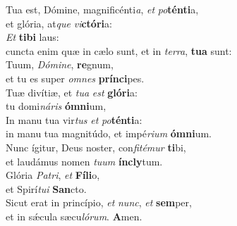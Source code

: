 \evenverse Tua est, Dómine, magnificénti\textit{a}, \textit{et} \textit{po}\textbf{tén}\textbf{ti}a,~\*\\
\evenverse et glória, at\textit{que} \textit{vi}\textbf{ctó}\textbf{ri}a:\\
\oddverse \textit{Et} \textbf{ti}\textbf{bi} laus:~\*\\
\oddverse cuncta enim quæ in cælo sunt, et in \textit{ter}\textit{ra}, \textbf{tu}\textbf{a} sunt:\\
\evenverse Tuum, \textit{Dó}\textit{mi}\textit{ne}, \textbf{re}gnum,~\*\\
\evenverse et tu es super \textit{om}\textit{nes} \textbf{prín}\textbf{ci}pes.\\
\oddverse Tuæ divítiæ, et \textit{tu}\textit{a} \textit{est} \textbf{gló}\textbf{ri}a:~\*\\
\oddverse tu domi\textit{ná}\textit{ris} \textbf{óm}\textbf{ni}um,\\
\evenverse In manu tua vir\textit{tus} \textit{et} \textit{po}\textbf{tén}\textbf{ti}a:~\*\\
\evenverse in manu tua magnitúdo, et impé\textit{ri}\textit{um} \textbf{óm}\textbf{ni}um.\\
\oddverse Nunc ígitur, Deus noster, con\textit{fi}\textit{té}\textit{mur} \textbf{ti}bi,~\*\\
\oddverse et laudámus nomen \textit{tu}\textit{um} \textbf{ín}\textbf{cly}tum.\\
\evenverse Glória \textit{Pa}\textit{tri}, \textit{et} \textbf{Fí}\textbf{li}o,~\*\\
\evenverse et Spirí\textit{tu}\textit{i} \textbf{San}cto.\\
\oddverse Sicut erat in princípio, \textit{et} \textit{nunc}, \textit{et} \textbf{sem}per,~\*\\
\oddverse et in sǽcula sæcu\textit{ló}\textit{rum}. \textbf{A}men.\\
